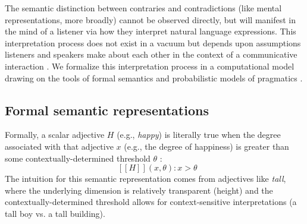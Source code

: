 \documentclass[floatsintext,doc]{apa6}
\begin{document}
The semantic distinction between contraries and contradictions (like mental representations, more broadly) cannot be observed directly, but will manifest in the mind of a listener via how they interpret natural language expressions. 
This interpretation process does not exist in a vacuum but depends upon assumptions listeners and speakers make about each other in the context of a communicative interaction \cite{Grice1975}.
We formalize this interpretation process in a computational model drawing on the tools of formal semantics and probabilistic models of pragmatics \cite{Franke2015a, Goodman2016:RSA}. 

\subsection{Formal semantic representations}

Formally, a scalar adjective $H$ (e.g., \emph{happy}) is literally true when the degree associated with that adjective \(x\) (e.g., the degree of happiness) is greater than some contextually-determined threshold \(\theta\) \cite{Kennedy2007}:
\begin{equation}
\mbox{ $[\![H]\!]$}(x, \theta): x > \theta \label{sem:pos}
\end{equation}
The intuition for this semantic representation comes from adjectives like \emph{tall}, where the underlying dimension is relatively transparent (height) and the contextually-determined threshold allows for context-sensitive interpretations (a tall boy vs. a tall building).
\end{document}
